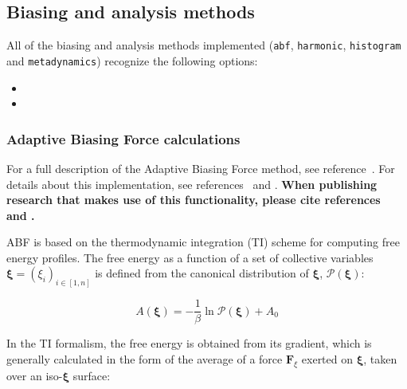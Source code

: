 \subsection{Biasing and analysis methods}
\label{sec:colvarbias}

All of the biasing and analysis methods implemented (\texttt{abf},
\texttt{harmonic}, \texttt{histogram} and \texttt{metadynamics})
recognize the following options:
\begin{itemize}

\item %

\item %

\end{itemize}


\subsubsection{Adaptive Biasing Force calculations}
\label{sec:colvarbias_abf}

For a full description of the Adaptive Biasing Force method, see
reference~\cite{Darve2008}. For details about this implementation,
see references~\cite{Henin2004} and \cite{Henin2010}. \textbf{When
publishing research that makes use of this functionality, please cite
references~\cite{Darve2008} and \cite{Henin2010}.}

ABF is based on the thermodynamic integration (TI) scheme for
computing free energy profiles. The free energy as a function
of a set of collective variables $\bm{\xi}=(\xi_{i})_{i\in[1,n]}$
is defined from the canonical distribution of $\bm{\xi}$, ${\mathcal P}(\bm{\xi})$:

\begin{equation}
  \label{eq:free}
  A(\bm{\xi}) = -\frac{1}{\beta} \ln {\mathcal P}(\bm{\xi}) + A_0
\end{equation}

In the TI formalism, the free energy is obtained from its gradient, 
which is generally calculated in the form of the average of a force
$\bm{F}_\xi$ exerted on $\bm{\xi}$, taken over an iso-$\bm{\xi}$ surface:

